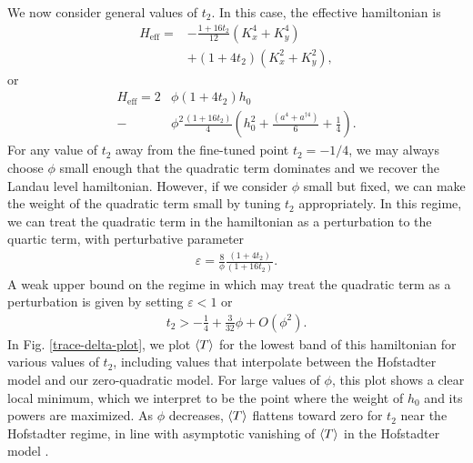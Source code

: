 \documentclass[aps,prb,twocolumn,letterpaper,twoside,nobalancelastpage,groupedaddress,amsmath,amssymb,floatfix,citeautoscript]{revtex4-1}
\begin{document}
We now consider general values of $t_2$. In this case, the effective hamiltonian is
\begin{align}
\label{t2-hamiltonian}
H_{\text{eff}} = &-\frac{1 + 16t_2}{12}\left(K_x^4 + K_y^4\right)\nonumber\\ &+ \left(1 + 4t_2\right) \left(K_x^2 + K_y^2\right),
\end{align}
or
\begin{align*}
H_{\text{eff}} = 2&\phi\left(1 + 4t_2\right) h_0\\  - &\phi^2\frac{\left(1 + 16t_2\right)}{4} \left(h_0^2 + \frac{\left(a^{4} + a^{\dag 4}\right)}{6} + \frac{1}{4}\right).
\end{align*}
For any value of $t_2$ away from the fine-tuned point $t_2 = -1/4$, we may always choose $\phi$ small enough that the quadratic term dominates and we recover the Landau level hamiltonian. However, if we consider $\phi$ small but fixed, we can make the weight of the quadratic term small by tuning $t_2$ appropriately. In this regime, we can treat the quadratic term in the hamiltonian as a perturbation to the quartic term, with perturbative parameter
\begin{align*}
\varepsilon = \frac{8}{\phi}\frac{\left(1 + 4t_2\right)}{\left(1 + 16t_2\right)}.
\end{align*}
A weak upper bound on the regime in which may treat the quadratic term as a perturbation is given by setting $\varepsilon < 1$ or
\begin{align*}
t_2 > -\frac{1}{4} + \frac{3}{32}\phi +O(\phi^2).
\end{align*}
In Fig. \ref{trace-delta-plot}, we plot $\expval{T}$ for the lowest band of this hamiltonian for various values of $t_2$, including values that interpolate between the Hofstadter model and our zero-quadratic model. 
For large values of $\phi$, this plot shows a clear local minimum, which we interpret to be the point where the weight of $h_0$ and its powers are maximized. As $\phi$ decreases, $\expval{T}$ flattens toward zero for $t_2$ near the Hofstadter regime, in line with asymptotic vanishing of $\expval{T}$ in the Hofstadter model \cite{bauer_quantum_2016}. 
\end{document}
